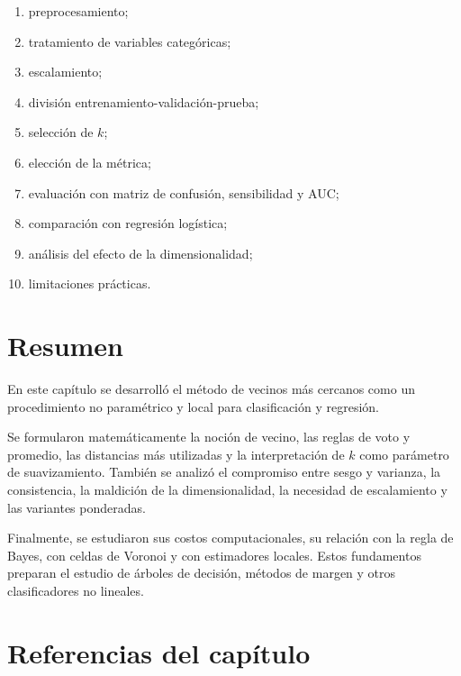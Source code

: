 \documentclass[
  spanish,
  10.5pt,
  letterpaper,
  DIV=11,
  numbers=noendperiod,
  oneside,
  open=any]{scrreprt}
\providecommand{\tightlist}{%
  \setlength{\itemsep}{0pt}\setlength{\parskip}{0pt}}
\theoremstyle{definition}
\theoremstyle{definition}
\theoremstyle{plain}
\theoremstyle{remark}
\begin{document}
\begin{enumerate}
\def\labelenumi{\arabic{enumi}.}
\tightlist
\item
  preprocesamiento;
\item
  tratamiento de variables categóricas;
\item
  escalamiento;
\item
  división entrenamiento-validación-prueba;
\item
  selección de \(k\);
\item
  elección de la métrica;
\item
  evaluación con matriz de confusión, sensibilidad y AUC;
\item
  comparación con regresión logística;
\item
  análisis del efecto de la dimensionalidad;
\item
  limitaciones prácticas.
\end{enumerate}

\section*{Resumen}\label{resumen-10}


En este capítulo se desarrolló el método de vecinos más cercanos como un
procedimiento no paramétrico y local para clasificación y regresión.

Se formularon matemáticamente la noción de vecino, las reglas de voto y
promedio, las distancias más utilizadas y la interpretación de \(k\)
como parámetro de suavizamiento. También se analizó el compromiso entre
sesgo y varianza, la consistencia, la maldición de la dimensionalidad,
la necesidad de escalamiento y las variantes ponderadas.

Finalmente, se estudiaron sus costos computacionales, su relación con la
regla de Bayes, con celdas de Voronoi y con estimadores locales. Estos
fundamentos preparan el estudio de árboles de decisión, métodos de
margen y otros clasificadores no lineales.

\section*{Referencias del
capítulo}\label{referencias-del-capuxedtulo-11}

\end{document}
